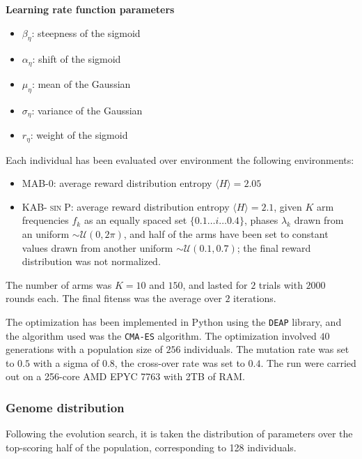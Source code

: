 \noindent \textbf{Learning rate function parameters}
\begin{itemize}
    \item $\beta_{\eta}$: steepness of the sigmoid
    \item $\alpha_{\eta}$: shift of the sigmoid
    \item $\mu_{\eta}$: mean of the Gaussian
    \item $\sigma_{\eta}$: variance of the Gaussian
    \item $r_{\eta}$: weight of the sigmoid
\end{itemize}

\noindent Each individual has been evaluated over environment the following environments:

\begin{itemize}
    \item \textsc{MAB-0}: average reward distribution entropy $\langle H\rangle=2.05$
    \item \textsc{KAB-$\sin$P}: average reward distribution entropy $\langle H\rangle=2.1$, given $K$ arm frequencies $f_{k}$ as an equally spaced set $\{0.1\ldots i\ldots 0.4\}$, phases $\lambda_{k}$ drawn from an uniform $\sim \mathcal{U}(0, 2\pi)$, and half of the arms have been set to constant values drawn from
        another uniform $\sim \mathcal{U}(0.1, 0.7)$; the final reward distribution was not normalized.
\end{itemize}

\noindent The number of arms was $K=10$ and $150$, and lasted for $2$ trials with $2000$ rounds each.
The final fitenss was the average over $2$ iterations.

\hfill \break
The optimization has been implemented in Python using the \texttt{DEAP} library, and the algorithm used was the \texttt{CMA-ES} algorithm. The optimization involved $40$ generations with a population size of $256$ individuals. The mutation rate was set to $0.5$ with a sigma of $0.8$, the cross-over rate was set to $0.4$.
The run were carried out on a 256-core AMD EPYC 7763 with 2TB of RAM.

\subsubsection{Genome distribution}
Following the evolution search, it is taken the distribution of parameters over the top-scoring half of the population, corresponding to 128 individuals.

